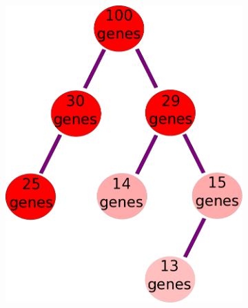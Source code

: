 \documentclass[linenumbers, doublespacing]{bmcart}
\begin{document}
\begin{backmatter}
\begin{figure}[h!]
\begin{subfigure}[b]{0.3\textwidth}
    \includegraphics[width=\textwidth]{figures/FloorTrimmingOntogeny.png}
	      \caption{}
    \label{fig:trim_ends}
  \end{subfigure}
  \begin{subfigure}[b]{0.3\textwidth}

\end{subfigure}
\end{figure}
\end{backmatter}
\end{document}
